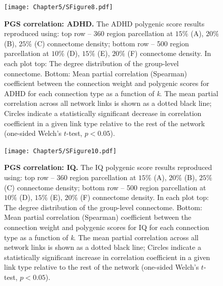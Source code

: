 \begin{figure}[h!]
\begin{center}
\texttt{[image: Chapter5/SFigure8.pdf]}%
\end{center}
\caption{\textbf{PGS correlation: ADHD.}
The ADHD polygenic score results reproduced using: top row -- 360 region parcellation at $15\%$ (A), $20\%$ (B), $25\%$ (C) connectome density; bottom row -- 500 region parcellation at $10\%$ (D), $15\%$ (E), $20\%$ (F) connectome density. In each plot top: The degree distribution of the group-level connectome. Bottom: Mean partial correlation (Spearman) coefficient between the connection weight and polygenic scores for ADHD for each connection type as a function of \textit{k}. The mean partial correlation across all network links is shown as a dotted black line; Circles indicate a statistically significant decrease in correlation coefficient in a given link type relative to the rest of the network (one-sided Welch's $t$-test, $p < 0.05$).}
\label{fig:Ch5SFig8}
\end{figure}

\begin{figure}[h!]
\begin{center}
\texttt{[image: Chapter5/SFigure10.pdf]}%
\end{center}
\caption{\textbf{PGS correlation: IQ.}
The IQ polygenic score results reproduced using: top row -- 360 region parcellation at $15\%$ (A), $20\%$ (B), $25\%$ (C) connectome density; bottom row -- 500 region parcellation at $10\%$ (D), $15\%$ (E), $20\%$ (F) connectome density. In each plot top: The degree distribution of the group-level connectome. Bottom: Mean partial correlation (Spearman) coefficient between the connection weight and polygenic scores for IQ for each connection type as a function of \textit{k}. The mean partial correlation across all network links is shown as a dotted black line; Circles indicate a statistically significant increase in correlation coefficient in a given link type relative to the rest of the network (one-sided Welch's $t$-test, $p < 0.05$).}
\label{fig:Ch5SFig10}
\end{figure}


